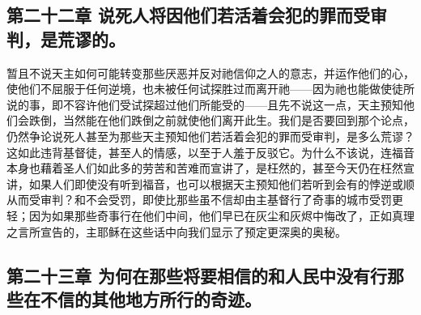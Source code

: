 
\subsection{第二十二章 说死人将因他们若活着会犯的罪而受审判，是荒谬的。}

暂且不说天主如何可能转变那些厌恶并反对祂信仰之人的意志，并运作他们的心，使他们不屈服于任何逆境，也未被任何试探胜过而离开祂——因为祂也能做使徒所说的事，即不容许他们受试探超过他们所能受的——且先不说这一点，天主预知他们会跌倒，当然能在他们跌倒之前就使他们离开此生。我们是否要回到那个论点，仍然争论说死人甚至为那些天主预知他们若活着会犯的罪而受审判，是多么荒谬？这如此违背基督徒，甚至人的情感，以至于人羞于反驳它。为什么不该说，连福音本身也藉着圣人们如此多的劳苦和苦难而宣讲了，是枉然的，甚至今天仍在枉然宣讲，如果人们即使没有听到福音，也可以根据天主预知他们若听到会有的悖逆或顺从而受审判？和不会受罚，即使比那些虽不信却由主基督行了奇事的城市受罚更轻；因为如果那些奇事行在他们中间，他们早已在灰尘和灰烬中悔改了，正如真理之言所宣告的，主耶稣在这些话中向我们显示了预定更深奥的奥秘。\par


\subsection{第二十三章 为何在那些将要相信的和人民中没有行那些在不信的其他地方所行的奇迹。}

